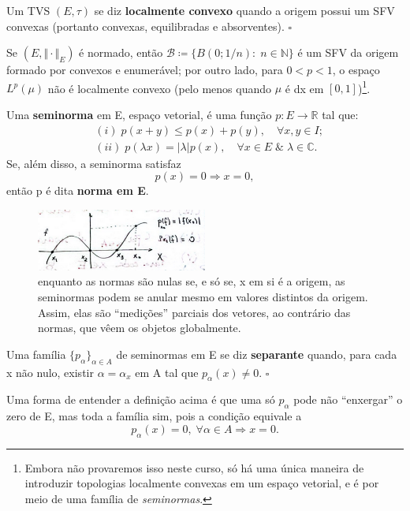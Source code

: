 \documentclass[../distribution_theory_notes.tex]{subfiles}
\begin{document}
\begin{def*}
	Um TVS \((E,  \tau )\) se diz \textbf{localmente convexo} quando a origem possui um SFV convexas (portanto convexas, equilibradas e absorventes). \(\square\)
\end{def*}
\begin{example}
	Se \((E, \Vert \cdot  \Vert_{E})\) é normado, então \(\mathcal{B}\coloneqq \{B(0; 1/n):\; n\in \mathbb{N}\}\) é um SFV da origem formado por convexos e enumerável; por outro lado, para \(0<p<1\), o espaço \(L^{p}(\mu )\) não é localmente convexo (pelo menos quando \(\mu \) é dx em \([0, 1]\))\footnote{Embora não provaremos isso neste curso, só há uma única maneira de introduzir topologias localmente convexas em um espaço vetorial, e é por meio de uma família de \textit{seminormas}.}.
\end{example}
\begin{def*}
	Uma \textbf{seminorma} em E, espaço vetorial, é uma função \(p:E\rightarrow \mathbb{R}\) tal que:
	\begin{align*}
		 & (i)\; p(x+y)\leq p(x)+p(y),\quad \forall x, y\in I;                                  \\
		 & (ii)\; p(\lambda x)=|\lambda |p(x),\quad \forall x\in E\;\&\;\lambda \in \mathbb{C}.
	\end{align*}
	Se, além disso, a seminorma satisfaz
	\[
		p(x)=0\Rightarrow x=0,
	\]
	então  p é dita \textbf{norma em E}.
\end{def*}
\begin{figure}[H]
	\begin{center}
		\includegraphics[height=0.5\textheight, width=0.5\textwidth, keepaspectratio]{./Images/seminorm_02.png}
	\end{center}
	\caption{enquanto as normas são nulas se, e só se, x em si é a origem, as seminormas podem se anular mesmo em valores distintos da origem. Assim, elas são ``medições'' parciais dos vetores, ao contrário das normas, que vêem os objetos globalmente.}
\end{figure}
\begin{def*}
	Uma família \(\{p_{\alpha }\}_{\alpha \in A}\) de seminormas em E se diz \textbf{separante} quando, para cada x não nulo, existir \(\alpha =\alpha_{x}\) em A tal que \(p_{\alpha }(x)\neq 0\). \(\square\)
\end{def*}
Uma forma de entender a definição acima é que uma só \(p_{\alpha }\) pode não ``enxergar'' o zero de E, mas toda a família sim, pois a condição equivale a
\[
	p_{\alpha }(x)=0,\; \forall \alpha \in A \Rightarrow x=0.
\]
\end{document}
